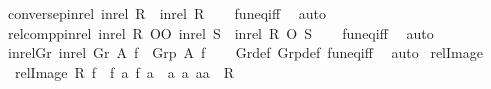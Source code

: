 \begin{isabellebody}
%
\isadelimproof
\isanewline
%
\endisadelimproof
\isanewline
{}\isamarkupfalse%
\ conversep{\isacharunderscore}{\kern0pt}in{\isacharunderscore}{\kern0pt}rel{\isacharcolon}{\kern0pt}\ {\isachardoublequoteopen}{\isacharparenleft}{\kern0pt}in{\isacharunderscore}{\kern0pt}rel\ R{\isacharparenright}{\kern0pt}{\isasyminverse}{\isasyminverse}\ {\isacharequal}{\kern0pt}\ in{\isacharunderscore}{\kern0pt}rel\ {\isacharparenleft}{\kern0pt}R{\isasyminverse}{\isacharparenright}{\kern0pt}{\isachardoublequoteclose}\isanewline
%
\isadelimproof
\ \ %
\endisadelimproof
%
\isatagproof
{}\isamarkupfalse%
\ fun{\isacharunderscore}{\kern0pt}eq{\isacharunderscore}{\kern0pt}iff\ \isamarkupfalse%
\ auto%
\endisatagproof
{\isafoldproof}%
%
\isadelimproof
\isanewline
%
\endisadelimproof
\isanewline
{}\isamarkupfalse%
\ relcompp{\isacharunderscore}{\kern0pt}in{\isacharunderscore}{\kern0pt}rel{\isacharcolon}{\kern0pt}\ {\isachardoublequoteopen}in{\isacharunderscore}{\kern0pt}rel\ R\ OO\ in{\isacharunderscore}{\kern0pt}rel\ S\ {\isacharequal}{\kern0pt}\ in{\isacharunderscore}{\kern0pt}rel\ {\isacharparenleft}{\kern0pt}R\ O\ S{\isacharparenright}{\kern0pt}{\isachardoublequoteclose}\isanewline
%
\isadelimproof
\ \ %
\endisadelimproof
%
\isatagproof
{}\isamarkupfalse%
\ fun{\isacharunderscore}{\kern0pt}eq{\isacharunderscore}{\kern0pt}iff\ \isamarkupfalse%
\ auto%
\endisatagproof
{\isafoldproof}%
%
\isadelimproof
\isanewline
%
\endisadelimproof
\isanewline
{}\isamarkupfalse%
\ in{\isacharunderscore}{\kern0pt}rel{\isacharunderscore}{\kern0pt}Gr{\isacharcolon}{\kern0pt}\ {\isachardoublequoteopen}in{\isacharunderscore}{\kern0pt}rel\ {\isacharparenleft}{\kern0pt}Gr\ A\ f{\isacharparenright}{\kern0pt}\ {\isacharequal}{\kern0pt}\ Grp\ A\ f{\isachardoublequoteclose}\isanewline
%
\isadelimproof
\ \ %
\endisadelimproof
%
\isatagproof
{}\isamarkupfalse%
\ Gr{\isacharunderscore}{\kern0pt}def\ Grp{\isacharunderscore}{\kern0pt}def\ fun{\isacharunderscore}{\kern0pt}eq{\isacharunderscore}{\kern0pt}iff\ \isamarkupfalse%
\ auto%
\endisatagproof
{\isafoldproof}%
%
\isadelimproof
\isanewline
%
\endisadelimproof
\isanewline
{}\isamarkupfalse%
\ relImage\ \isanewline
\ \ {\isachardoublequoteopen}relImage\ R\ f\ {\isasymequiv}\ {\isacharbraceleft}{\kern0pt}{\isacharparenleft}{\kern0pt}f\ a{}{\isacharcomma}{\kern0pt}\ f\ a{}{\isacharparenright}{\kern0pt}\ {\isacharbar}{\kern0pt}\ a{}\ a{}{\isachardot}{\kern0pt}\ {\isacharparenleft}{\kern0pt}a{}{\isacharcomma}{\kern0pt}a{}{\isacharparenright}{\kern0pt}\ {\isasymin}\ R{\isacharbraceright}{\kern0pt}{\isachardoublequoteclose}\isanewline

\end{isabellebody}
